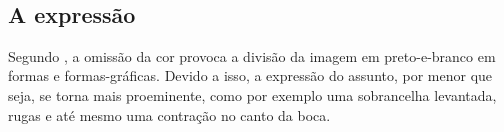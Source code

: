 \documentclass[
	article,			%
	12pt,				%
	oneside,			%
	a4paper,			%
	english,			%
	brazil,				%
	sumario=tradicional
	]{abntex2}
\begin{document}
\begin{figure}[!htb]
    \\
    \vspace{2.5em}
\label{fig:dag}
\end{figure}

\newpage

\subsection{A expressão}

Segundo , a omissão da cor provoca a divisão da imagem em preto-e-branco em formas e formas-gráficas. Devido a isso, a expressão do assunto, por menor que seja, se torna mais proeminente, como por exemplo uma sobrancelha levantada, rugas e até mesmo uma contração no canto da boca. 
\end{document}

